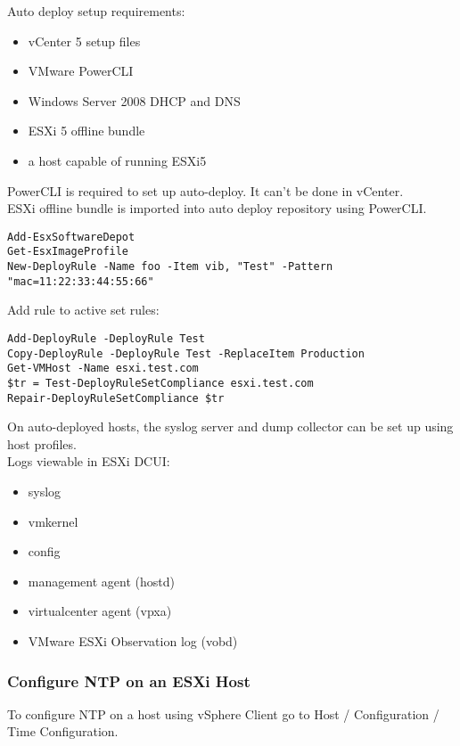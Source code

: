 Auto deploy setup requirements:

\begin{itemize}
\item vCenter 5 setup files
\item VMware PowerCLI
\item Windows Server 2008 DHCP and DNS
\item ESXi 5 offline bundle
\item a host capable of running ESXi5
\end{itemize}

PowerCLI is required to set up auto-deploy. It can't be done in vCenter.\\

ESXi offline bundle is imported into auto deploy repository using PowerCLI.

\begin{verbatim}
Add-EsxSoftwareDepot
Get-EsxImageProfile
New-DeployRule -Name foo -Item vib, "Test" -Pattern "mac=11:22:33:44:55:66"  
\end{verbatim}

Add rule to active set rules:

\begin{verbatim}
Add-DeployRule -DeployRule Test
Copy-DeployRule -DeployRule Test -ReplaceItem Production
Get-VMHost -Name esxi.test.com
$tr = Test-DeployRuleSetCompliance esxi.test.com
Repair-DeployRuleSetCompliance $tr
\end{verbatim}

On auto-deployed hosts, the syslog server and dump collector can be set up
using host profiles.\\

Logs viewable in ESXi DCUI:

\begin{itemize}
\item syslog
\item vmkernel
\item config
\item management agent (hostd)
\item virtualcenter agent (vpxa)
\item VMware ESXi Observation log (vobd)
\end{itemize}

\subsubsection{Configure NTP on an ESXi Host}

To configure NTP on a host using vSphere Client go to Host / Configuration /
Time Configuration.

